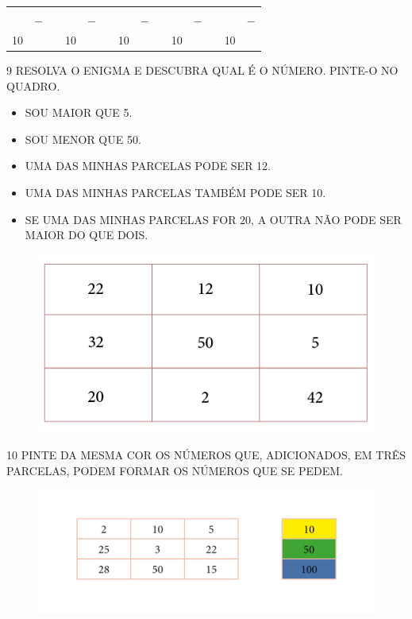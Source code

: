 \begin{center}
\begin{tabular}{llllllllllllll}
\mbox{} &  &  & \mbox{} &  &  & \mbox{} &  &  & \mbox{} &  &  & \mbox{} &  \\
\mbox{} & $-$ &  & \mbox{} & $-$ &  & \mbox{} & $-$ &  & \mbox{} & $-$ &  & \mbox{} & $-$ \\ \cline{1-1} \cline{4-4} \cline{7-7} \cline{10-10} \cline{13-13}
10 &  &  & 10 &  &  & 10 &  &  & 10 &  &  & 10 & 
\end{tabular}
\end{center}

\pagebreak
\num{9} RESOLVA O ENIGMA E DESCUBRA QUAL É O NÚMERO. PINTE-O NO QUADRO.

\begin{itemize}
\item SOU MAIOR QUE 5.

\item SOU MENOR QUE 50.

\item UMA DAS MINHAS PARCELAS PODE SER 12.

\item UMA DAS MINHAS PARCELAS TAMBÉM PODE SER 10.

\item SE UMA DAS MINHAS PARCELAS FOR 20, A OUTRA NÃO PODE SER MAIOR DO QUE DOIS.
\end{itemize}

\begin{figure}[htpb!]
\centering
\includegraphics[width=.5\textwidth]{./media/SAEB_1ANO_MAT_FIGURA25.png}
\end{figure}


\num{10} PINTE DA MESMA COR OS NÚMEROS QUE, ADICIONADOS, EM TRÊS PARCELAS, PODEM
FORMAR OS NÚMEROS QUE SE PEDEM.

\begin{figure}[htpb!]
\includegraphics[width=\textwidth]{./media/SAEB_1ANO_MAT_FIGURA26.png}
\end{figure}

